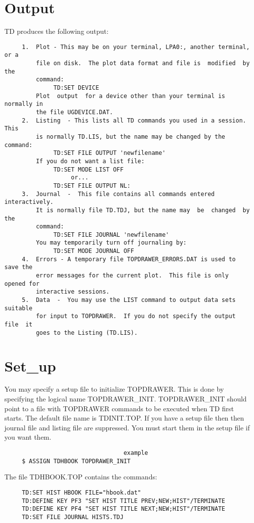\section{Output}
TD produces the following output:  
\begin{verbatim}
     1.  Plot - This may be on your terminal, LPA0:, another terminal, or a
         file on disk.  The plot data format and file is  modified  by  the
         command:  
              TD:SET DEVICE 
         Plot  output  for a device other than your terminal is normally in
         the file UGDEVICE.DAT.  
     2.  Listing  - This lists all TD commands you used in a session.  This
         is normally TD.LIS, but the name may be changed by the command:  
              TD:SET FILE OUTPUT 'newfilename' 
         If you do not want a list file:  
              TD:SET MODE LIST OFF 
                   or...  
              TD:SET FILE OUTPUT NL:  
     3.  Journal  -  This file contains all commands entered interactively.
         It is normally file TD.TDJ, but the name may  be  changed  by  the
         command:  
              TD:SET FILE JOURNAL 'newfilename' 
         You may temporarily turn off journaling by:  
              TD:SET MODE JOURNAL OFF 
     4.  Errors - A temporary file TOPDRAWER_ERRORS.DAT is used to save the
         error messages for the current plot.  This file is only opened for
         interactive sessions.  
     5.  Data  -  You may use the LIST command to output data sets suitable
         for input to TOPDRAWER.  If you do not specify the output file  it
         goes to the Listing (TD.LIS).  
\end{verbatim}
\section{Set\_up}
You  may  specify  a  setup  file to initialize TOPDRAWER.  This is done by
specifying the logical name TOPDRAWER\_INIT.  TOPDRAWER\_INIT should point to
a  file  with  TOPDRAWER commands to be executed when TD first starts.  The
default file name is TDINIT.TOP.  If  you  have  a  setup  file  then  then
journal  file  and listing file are suppressed.  You must start them in the
setup file if you want them.  

\begin{verbatim}
                                  example
     $ ASSIGN TDHBOOK TOPDRAWER_INIT 
\end{verbatim}

The file TDHBOOK.TOP contains the commands:  
\begin{verbatim}
     TD:SET HIST HBOOK FILE="hbook.dat" 
     TD:DEFINE KEY PF3 "SET HIST TITLE PREV;NEW;HIST"/TERMINATE 
     TD:DEFINE KEY PF4 "SET HIST TITLE NEXT;NEW;HIST"/TERMINATE 
     TD:SET FILE JOURNAL HISTS.TDJ 
\end{verbatim}

